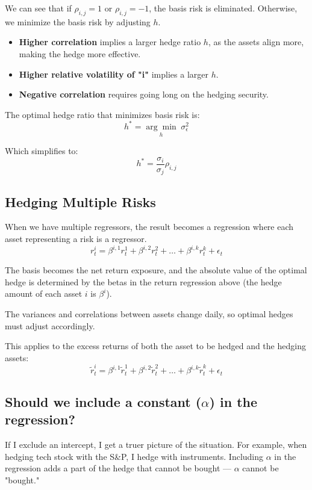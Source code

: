 \documentclass{article}
\begin{document}
We can see that if $\rho_{i,j} = 1$ or $\rho_{i,j} = -1$, the basis risk is eliminated. Otherwise, we minimize the basis risk by adjusting $h$.

\begin{itemize}
    \item \textbf{Higher correlation} implies a larger hedge ratio $h$, as the assets align more, making the hedge more effective.
    \item \textbf{Higher relative volatility of "i"} implies a larger $h$.
    \item \textbf{Negative correlation} requires going long on the hedging security.
\end{itemize}

The optimal hedge ratio that minimizes basis risk is:
$$ h^{*} = \underset{h}{\arg\min} \hspace{3pt} \sigma_{\epsilon}^2 $$

Which simplifies to:
$$ h^{*} = \frac{\sigma_i}{\sigma_j} \rho_{i,j} $$

\subsection{Hedging Multiple Risks}
When we have multiple regressors, the result becomes a regression where each asset representing a risk is a regressor.
$$ r_t^i = \beta^{i,1} r_t^1 + \beta^{i,2} r_t^2 + \dots + \beta^{i,k} r_t^k + \epsilon_t $$

The basis becomes the net return exposure, and the absolute value of the optimal hedge is determined by the betas in the return regression above (the hedge amount of each asset $i$ is $\beta^i$).

The variances and correlations between assets change daily, so optimal hedges must adjust accordingly.

This applies to the excess returns of both the asset to be hedged and the hedging assets:
$$ \tilde{r}_t^i = \beta^{i,1} \tilde{r}_t^1 + \beta^{i,2} \tilde{r}_t^2 + \dots + \beta^{i,k} \tilde{r}_t^k + \epsilon_t $$

\subsection{Should we include a constant ($\alpha$) in the regression?}
If I exclude an intercept, I get a truer picture of the situation. For example, when hedging tech stock with the S\&P, I hedge with instruments. Including $\alpha$ in the regression adds a part of the hedge that cannot be bought — $\alpha$ cannot be "bought."
\end{document}
